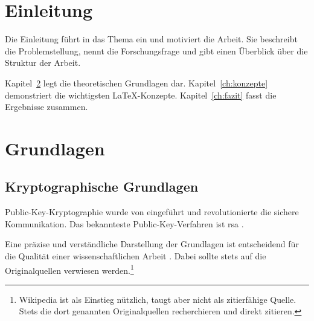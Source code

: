 \documentclass[
  12pt,       %
  a4paper,    %
  twoside,    %
  openright,  %
]{book}
\begin{document}
\tableofcontents

\cleardoublepage
{}
\listoffigures

\cleardoublepage
{}
\printacronyms[heading=chapter*, name=Abkürzungsverzeichnis]

\mainmatter

\chapter{Einleitung}
\label{ch:einleitung}

Die Einleitung führt in das Thema ein und motiviert die Arbeit.
Sie beschreibt die Problemstellung, nennt die Forschungsfrage und
gibt einen Überblick über die Struktur der Arbeit.

Kapitel~\ref{ch:grundlagen} legt die theoretischen Grundlagen dar.
Kapitel~\ref{ch:konzepte} demonstriert die wichtigsten \LaTeX-Konzepte.
Kapitel~\ref{ch:fazit} fasst die Ergebnisse zusammen.

\chapter{Grundlagen}
\label{ch:grundlagen}

\section{Kryptographische Grundlagen}
\label{sec:krypto}

Public-Key-Kryptographie wurde von \textcite{DiffieHellman1976}
eingeführt und revolutionierte die sichere Kommunikation.
Das bekannteste Public-Key-Verfahren ist \ac{rsa} \cite{Rivest1978}.

Eine präzise und verständliche Darstellung der Grundlagen ist
entscheidend für die Qualität einer wissenschaftlichen Arbeit
\cite{Zobel2014}. Dabei sollte stets auf die Originalquellen
verwiesen werden.\footnote{
  Wikipedia ist als Einstieg nützlich, taugt aber nicht als
  zitierfähige Quelle. Stets die dort genannten Originalquellen
  recherchieren und direkt zitieren.}
\end{document}
